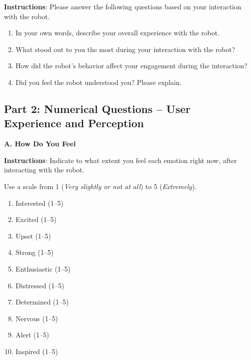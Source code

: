 \documentclass[runningheads]{llncs}
\begin{document}
\textbf{Instructions}: Please answer the following questions based on your interaction with the robot.

\begin{enumerate}
    \item In your own words, describe your overall experience with the robot.
    \item What stood out to you the most during your interaction with the robot?
    \item How did the robot's behavior affect your engagement during the interaction?
    \item Did you feel the robot understood you? Please explain.
\end{enumerate}

\subsection*{Part 2: Numerical Questions – User Experience and Perception}

\textbf{A. How Do You Feel}

\textbf{Instructions}: Indicate to what extent you feel each emotion right now, after interacting with the robot.

Use a scale from 1 (\textit{Very slightly or not at all}) to 5 (\textit{Extremely}).

\begin{enumerate}
    \item Interested \dotfill \underline{\hspace{2cm}} (1--5)
    \item Excited \dotfill \underline{\hspace{2cm}} (1--5)
    \item Upset \dotfill \underline{\hspace{2cm}} (1--5)
    \item Strong \dotfill \underline{\hspace{2cm}} (1--5)
    \item Enthusiastic \dotfill \underline{\hspace{2cm}} (1--5)
    \item Distressed \dotfill \underline{\hspace{2cm}} (1--5)
    \item Determined \dotfill \underline{\hspace{2cm}} (1--5)
    \item Nervous \dotfill \underline{\hspace{2cm}} (1--5)
    \item Alert \dotfill \underline{\hspace{2cm}} (1--5)
    \item Inspired \dotfill \underline{\hspace{2cm}} (1--5)
\end{enumerate}
\end{document}
